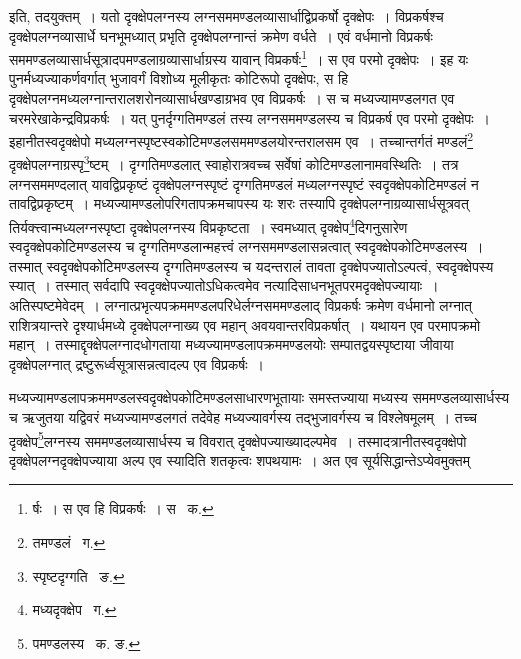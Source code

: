 \documentclass[11pt, openany]{book}
\begin{document}
\newpage

\noindent इति, तदयुक्तम्~। यतो दृक्क्षेपलग्नस्य लग्नसममण्डलव्यासार्धाद्विप्रकर्षो दृक्क्षेपः~। विप्रकर्षश्च दृक्क्षेपलग्नव्यासार्धे घनभूमध्यात् प्रभृति
दृक्क्षेपलग्नान्तं क्रमेण वर्धते~। एवं वर्धमानो विप्रकर्षः सममण्डलव्यासार्धसूत्रादपमण्डलाग्रव्यासार्धाग्रस्य यावान् विप्रकर्षः\renewcommand{\thefootnote}{१}\footnote{र्षः~। स एव हि विप्रकर्षः~। स \textendash\ क.}~। स एव परमो दृक्क्षेपः~। इह यः पुनर्मध्यज्याकर्णवर्गात् भुजावर्गं विशोध्य मूलीकृतः कोटिरूपो दृक्क्षेपः, स हि दृक्क्षेपलग्नमध्यलग्नान्तरालशरोनव्यासार्धखण्डाग्रभव एव
विप्रकर्षः~। स च मध्यज्यामण्डलगत एव चरमरेखाकेन्द्रविप्रकर्षः~। यत् पुनर्दृग्गतिमण्डलं तस्य लग्नसममण्डलस्य च विप्रकर्ष एव परमो दृक्क्षेपः~। इहानीतस्वदृक्क्षेपो मध्यलग्नस्पृष्टस्वकोटिमण्डलसममण्डलयोरन्तरालसम एव~। तच्चान्तर्गतं मण्डलं\renewcommand{\thefootnote}{२}\footnote{तमण्डलं \textendash\ ग.}
दृक्क्षेपलग्नाग्रस्पृ\renewcommand{\thefootnote}{३}\footnote{स्पृष्टदृग्गति \textendash\ ङ.}ष्टम्~। दृग्गतिमण्डलात् स्वाहोरात्रवच्च सर्वेषां कोटिमण्डलानामवस्थितिः~। तत्र लग्नसममण्दलात् यावद्विप्रकृष्टं दृक्क्षेपलग्नस्पृष्टं दृग्गतिमण्डलं मध्यलग्नस्पृष्टं स्वदृक्क्षेपकोटिमण्डलं न तावद्विप्रकृष्टम्~। मध्यज्यामण्डलोपरिगतापक्रमचापस्य यः शरः तस्यापि दृक्क्षेपलग्नाग्रव्यासार्धसूत्रवत् तिर्यक्त्त्वान्मध्यलग्नस्पृष्टा दृक्क्षेपलग्नस्य विप्रकृष्टता~। स्वमध्यात् दृक्क्षेप\renewcommand{\thefootnote}{४}\footnote{मध्यदृक्क्षेप \textendash\ ग.}दिगनुसारेण स्वदृक्क्षेपकोटिमण्डलस्य च दृग्गतिमण्डलान्महत्त्वं लग्नसममण्डलासन्नत्वात् स्वदृक्क्षेपकोटिमण्डलस्य~। तस्मात् स्वदृक्क्षेपकोटिमण्डलस्य दृग्गतिमण्डलस्य च यदन्तरालं तावता दृक्क्षेपज्यातोऽल्पत्वं, स्वदृक्क्षेपस्य स्यात्~। तस्मात् सर्वदापि 
स्वदृक्क्षेपज्यातोऽधिकत्वमेव नत्यादिसाधनभूतपरमदृक्क्षेपज्यायाः~। अतिस्पष्टमेवेदम्~। लग्नात्प्रभृत्यपक्रममण्डलपरिधेर्लग्नसममण्डलाद्
विप्रकर्षः क्रमेण वर्धमानो लग्नात् राशित्रयान्तरे दृश्यार्धमध्ये दृक्क्षेपलग्नाख्य एव महान् अवयवान्तरविप्रकर्षात्~। यथायन एव परमापक्रमो महान्~। 
तस्माद्दृक्क्षेपलग्नादधोगताया मध्यज्यामण्डलापक्रममण्डलयोः सम्पातद्वयस्पृष्टाया जीवाया दृक्क्षेपलग्नात् द्रष्टुरूर्ध्वसूत्रासन्नत्वादल्प
एव विप्रकर्षः~। 

\newpage

\noindent मध्यज्यामण्डलापक्रममण्डलस्वदृक्क्षेपकोटिमण्डलसाधारणभूतायाः समस्तज्याया मध्यस्य सममण्डलव्यासार्धस्य च ऋजुतया यद्विवरं मध्यज्यामण्डलगतं तदेवेह मध्यज्यावर्गस्य तद्भुजावर्गस्य च विश्लेषमूलम्~। तच्च दृक्क्षेप\renewcommand{\thefootnote}{१}\footnote{पमण्डलस्य \textendash\ क. ङ.}लग्नस्य सममण्डलव्यासार्धस्य च विवरात् दृक्क्षेपज्याख्यादल्पमेव~। तस्मादत्रानीतस्वदृक्क्षेपो दृक्क्षेपलग्नदृक्क्षेपज्याया अल्प एव स्यादिति शतकृत्वः शपथयामः~। अत एव सूर्यसिद्धान्तेऽप्येवमुक्तम्\textendash 
\end{document}
